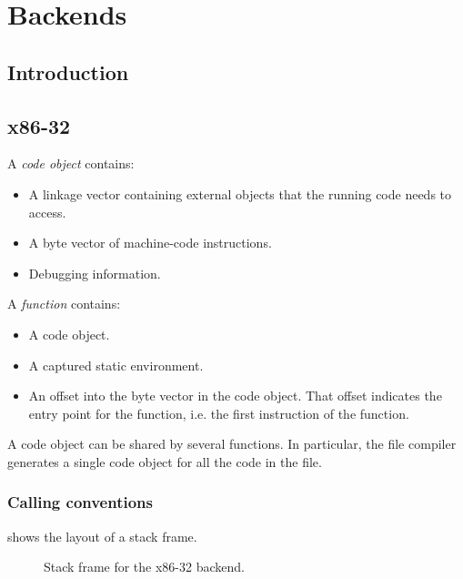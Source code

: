 \chapter{Backends}

\section{Introduction}

\section{x86-32}

A \emph{code object} contains:

\begin{itemize}
\item A linkage vector containing external objects that the running
  code needs to access.
\item A byte vector of machine-code instructions.  
\item Debugging information.
\end{itemize}

A \emph{function} contains:

\begin{itemize}
\item A code object.
\item A captured static environment. 
\item An offset into the byte vector in the code object.  That offset
  indicates the entry point for the function, i.e. the first
  instruction of the function. 
\end{itemize}

A code object can be shared by several functions.  In particular, the
file compiler generates a single code object for all the code in the
file. 

\subsection{Calling conventions}

 shows the layout of a stack frame. 

\begin{figure}
\begin{center}
\end{center}
\caption{\label{fig-x86-32-stack-frame}
Stack frame for the x86-32 backend.}
\end{figure}

